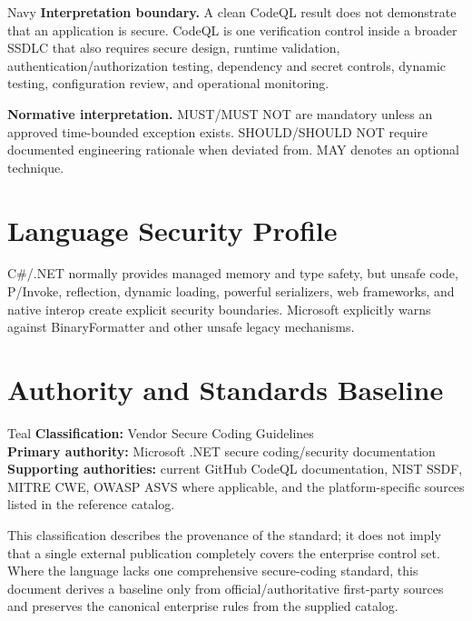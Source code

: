 \documentclass[10pt,letterpaper]{article}
\begin{document}
\begin{callout}{Navy}
\textbf{Interpretation boundary.} A clean CodeQL result does not demonstrate that an application is secure. CodeQL is one verification control inside a broader SSDLC that also requires secure design, runtime validation, authentication/authorization testing, dependency and secret controls, dynamic testing, configuration review, and operational monitoring.
\end{callout}

\textbf{Normative interpretation.} MUST/MUST NOT are mandatory unless an approved time-bounded exception exists. SHOULD/SHOULD NOT require documented engineering rationale when deviated from. MAY denotes an optional technique.

\section{Language Security Profile}
C\#/.NET normally provides managed memory and type safety, but unsafe code, P/Invoke, reflection, dynamic loading, powerful serializers, web frameworks, and native interop create explicit security boundaries. Microsoft explicitly warns against BinaryFormatter and other unsafe legacy mechanisms.
\section{Authority and Standards Baseline}
\begin{callout}{Teal}
\textbf{Classification:} Vendor Secure Coding Guidelines\\
\textbf{Primary authority:} Microsoft .NET secure coding/security documentation\\
\textbf{Supporting authorities:} current GitHub CodeQL documentation, NIST SSDF, MITRE CWE, OWASP ASVS where applicable, and the platform-specific sources listed in the reference catalog.
\end{callout}
This classification describes the provenance of the standard; it does not imply that a single external publication completely covers the enterprise control set. Where the language lacks one comprehensive secure-coding standard, this document derives a baseline only from official/authoritative first-party sources and preserves the canonical enterprise rules from the supplied catalog.
\end{document}
